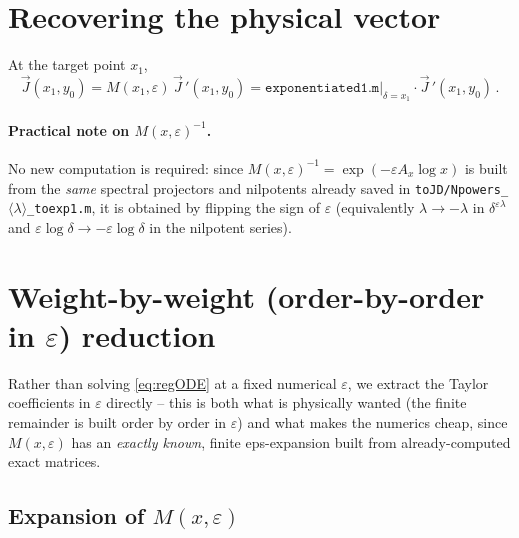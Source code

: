 \documentclass[11pt]{article}
\newcommand{\eps}{\varepsilon}
\newcommand{\Ax}{A_x}
\newcommand{\Jvec}{\vec J}
\newcommand{\Jreg}{\vec J\,'}
\begin{document}
\section{Recovering the physical vector}
\label{sec:recover}

At the target point $x_1$,
\begin{equation}
\Jvec(x_1,y_0) = M(x_1,\eps)\,\Jreg(x_1,y_0)
= \texttt{exponentiated1.m}\big|_{\delta = x_1} \cdot \Jreg(x_1,y_0)\,.
\end{equation}

\paragraph{Practical note on $M(x,\eps)^{-1}$.} No new computation is required: since
$M(x,\eps)^{-1} = \exp(-\eps \Ax \log x)$ is built from the \emph{same} spectral projectors and nilpotents
already saved in \texttt{toJD/Npowers\_$\langle\lambda\rangle$\_toexp1.m}, it is obtained by flipping
the sign of $\eps$ (equivalently $\lambda \to -\lambda$ in $\delta^{\eps\lambda}$ and
$\eps\log\delta \to -\eps\log\delta$ in the nilpotent series).

\section{Weight-by-weight (order-by-order in $\eps$) reduction}

Rather than solving \eqref{eq:regODE} at a fixed numerical $\eps$, we extract the Taylor
coefficients in $\eps$ directly -- this is both what is physically wanted (the finite remainder is
built order by order in $\eps$) and what makes the numerics cheap, since $M(x,\eps)$ has an
\emph{exactly known}, finite eps-expansion built from already-computed exact matrices.

\subsection{Expansion of $M(x,\eps)$}
\end{document}
